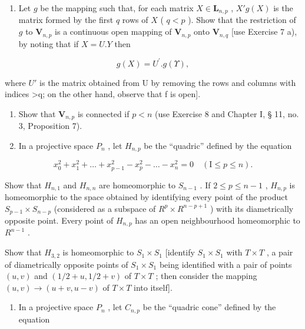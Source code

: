 \begin{enumerate}
\def\labelenumi{\arabic{enumi})}
\setcounter{enumi}{7}
\tightlist
\item
  Let \(g\) be the mapping such that, for each matrix \(X \in \mathbf{L}_{n,p}\) , \(X'g(X)\) is the matrix formed by the first \(q\) rows of \(X\) ( \(q < p\) ). Show that the restriction of \(g\) to \(\mathbf{V}_{n,p}\) is a continuous open mapping of \(\mathbf{V}_{n,p}\) onto \(\mathbf{V}_{n,q}\) {[}use Exercise 7 a), by noting that if \(X = U.Y\) then
\end{enumerate}

\[
g (X) = U ^ {\prime}. g (\Upsilon),
\]

where \(U'\) is the matrix obtained from U by removing the rows and columns with indices \textgreater q; on the other hand, observe that f is open{]}.

\begin{enumerate}
\def\labelenumi{\arabic{enumi})}
\setcounter{enumi}{8}
\item
  Show that \(\mathbf{V}_{n,p}\) is connected if \(p < n\) (use Exercise 8 and Chapter I, § 11, no. 3, Proposition 7).
\item
  In a projective space \(P_{n}\) , let \(H_{n,p}\) be the ``quadric'' defined by the equation
\end{enumerate}

\[
x _ {0} ^ {2} + x _ {1} ^ {2} + \dots + x _ {p - 1} ^ {2} - x _ {p} ^ {2} - \dots - x _ {n} ^ {2} = 0 \quad (\mathrm{I} \leqslant p \leqslant n).
\]

Show that \(H_{n,1}\) and \(H_{n,n}\) are homeomorphic to \(S_{n-1}\) . If \(2 \leqslant p \leqslant n - 1\) , \(H_{n,p}\) is homeomorphic to the space obtained by identifying every point of the product \(S_{p-1} \times S_{n-p}\) (considered as a subspace of \(R^{p} \times R^{n-p+1}\) ) with its diametrically opposite point. Every point of \(H_{n,p}\) has an open neighbourhood homeomorphic to \(R^{n-1}\) .

Show that \(H_{3,2}\) is homeomorphic to \(S_{1} \times S_{1}\) {[}identify \(S_{1} \times S_{1}\) with \(T \times T\) , a pair of diametrically opposite points of \(S_{1} \times S_{1}\) being identified with a pair of points \((u, v)\) and \((1/2 + u, 1/2 + v)\) of \(T \times T\) ; then consider the mapping \((u, v) \to (u + v, u - v)\) of \(T \times T\) into itself{]}.

\begin{enumerate}
\def\labelenumi{\arabic{enumi})}
\setcounter{enumi}{10}
\tightlist
\item
  In a projective space \(P_{n}\) , let \(C_{n,p}\) be the ``quadric cone'' defined by the equation
\end{enumerate}


